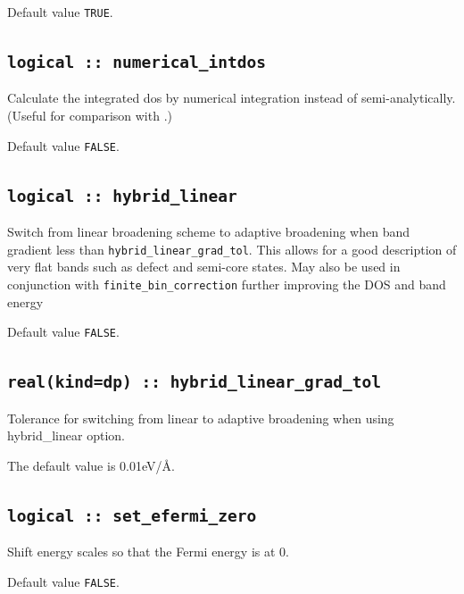 \documentclass[a4paper,11pt,twoside]{book}
\begin{document}
Default value \verb#TRUE#.

\subsection[numerical\_intdos]{\tt logical :: numerical\_intdos}
Calculate the integrated dos by numerical integration instead of semi-analytically. (Useful for comparison with \lindos.)

Default value \verb#FALSE#.

\subsection[hybrid\_linear]{\tt logical :: hybrid\_linear}
Switch from linear broadening scheme to adaptive broadening when band gradient less than \verb#hybrid_linear_grad_tol#. 
This allows for a good description of very flat bands such as defect and semi-core states. May also be used in conjunction 
with \verb#finite_bin_correction# further improving the DOS and band energy

Default value \verb#FALSE#.

\subsection[hybrid\_linear\_grad\_tol]{\tt real(kind=dp) :: hybrid\_linear\_grad\_tol}
Tolerance for switching from linear to adaptive broadening when using hybrid\_linear option.

The default value is 0.01eV/\AA.


\subsection[set\_efermi\_zero]{\tt logical :: set\_efermi\_zero}
Shift energy scales so that the Fermi energy is at 0.

Default value \verb#FALSE#.
\end{document}
